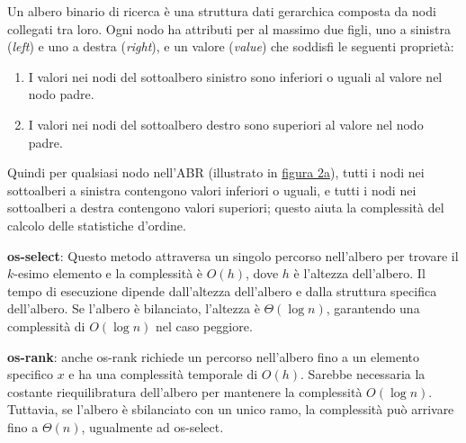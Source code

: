 \documentclass[onecolumn]{article}
\begin{document}
Un albero binario di ricerca è una struttura dati gerarchica composta da nodi collegati tra loro. Ogni nodo ha attributi per al massimo due figli, uno a sinistra (\textit{left}) e uno a destra (\textit{right}), e un valore (\textit{value}) che soddisfi le seguenti proprietà:

\begin{enumerate}
	\setlength\itemsep{-0.25em}
	\item I valori nei nodi del sottoalbero sinistro sono inferiori o uguali al valore nel nodo padre.
	\item I valori nei nodi del sottoalbero destro sono superiori al valore nel nodo padre.
\end{enumerate}

Quindi per qualsiasi nodo nell'ABR (illustrato in \hyperref[fig:alberi]{figura 2a}), tutti i nodi nei sottoalberi a sinistra contengono valori inferiori o uguali, e tutti i nodi nei sottoalberi a destra contengono valori superiori; questo aiuta la complessità del calcolo delle statistiche d'ordine. \vspace{1em}

\textbf{os-select}: Questo metodo attraversa un singolo percorso nell'albero per trovare il $k$-esimo elemento e la complessità è $O(h)$, dove $h$ è l'altezza dell'albero. Il tempo di esecuzione dipende dall'altezza dell'albero e dalla struttura specifica dell'albero. Se l'albero è bilanciato, l'altezza è $\Theta(\log n)$, garantendo una complessità di $O(\log n)$ nel caso peggiore. \vspace{0.5em}

\textbf{os-rank}: anche os-rank richiede un percorso nell'albero fino a un elemento specifico $x$ e ha una complessità temporale di $O(h)$. Sarebbe necessaria la costante riequilibratura dell'albero per mantenere la complessità $O(\log n)$. Tuttavia, se l'albero è sbilanciato con un unico ramo, la complessità può arrivare fino a $\Theta(n)$, ugualmente ad os-select.
\end{document}
